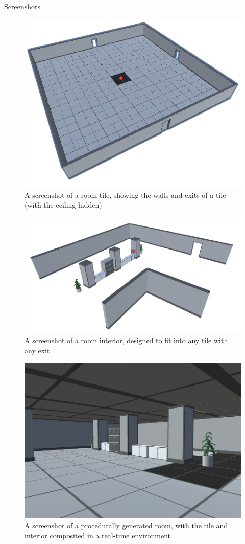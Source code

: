 \documentclass[final]{cmpreport}
\begin{document}
\begin{section}{Screenshots}
    


\begin{figure}[H]
    \centering
    \includegraphics[width=.8\textwidth]{img/prefabroom.png}
    \caption{A screenshot of a room tile, showing the walls and exits of a tile (with the ceiling hidden)}
    \label{fig:prefab-room}
\end{figure}

\begin{figure}[H]
    \centering
    \includegraphics[width=.8\textwidth]{img/interior.png}
    \caption{A screenshot of a room interior, designed to fit into any tile with any exit}
    \label{fig:prefab-int}
\end{figure}

\begin{figure}[H]
    \centering
    \includegraphics[width=.8\textwidth]{img/imp-int.png}
    \caption{A screenshot of a procedurally generated room, with the tile and interior composited in a real-time environment}
    \label{fig:room}
\end{figure}




\end{section}
\end{document}
